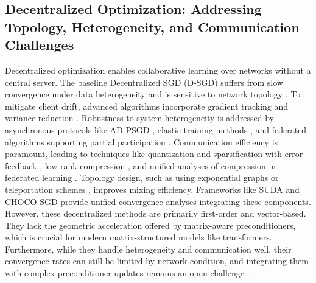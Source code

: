 \documentclass[11pt]{article}
\begin{document}
\subsection{Decentralized Optimization: Addressing Topology, Heterogeneity, and Communication Challenges}
Decentralized optimization enables collaborative learning over networks without a central server. The baseline Decentralized SGD (D-SGD) suffers from slow convergence under data heterogeneity and is sensitive to network topology \citep{alghunaim2022unified}. To mitigate client drift, advanced algorithms incorporate gradient tracking \citep{Tang2018D2DT, Liu2023DecentralizedGT, xin2021improved} and variance reduction \citep{Condat2024LoCoDLCD}. Robustness to system heterogeneity is addressed by asynchronous protocols like AD-PSGD \citep{Lian2017AsynchronousDP}, elastic training methods \citep{lin2019dynamic}, and federated algorithms supporting partial participation \citep{Wang2022FedADMMAF}. Communication efficiency is paramount, leading to techniques like quantization and sparsification with error feedback \citep{basu2019qsparse, Richtárik2021EF21AN, stich2018sparsified, Qian2020ErrorCD, Fatkhullin2023MomentumPI}, low-rank compression \citep{chen2025greedy}, and unified analyses of compression in federated learning \citep{Haddadpour2020FederatedLW}. Topology design, such as using exponential graphs \citep{Ying2021ExponentialGI} or teleportation schemes \citep{Takezawa2025ScalableDL}, improves mixing efficiency. Frameworks like SUDA \citep{alghunaim2022unified} and CHOCO-SGD \citep{Koloskova2019DecentralizedSO} provide unified convergence analyses integrating these components. However, these decentralized methods are primarily first-order and vector-based. They lack the geometric acceleration offered by matrix-aware preconditioners, which is crucial for modern matrix-structured models like transformers. Furthermore, while they handle heterogeneity and communication well, their convergence rates can still be limited by network condition, and integrating them with complex preconditioner updates remains an open challenge \citep{He2023UnbiasedCS, Huang2023StochasticCA, He2023LowerBA, Sato2020NetworkDensityControlledDP, He2024AdjacentLD, Carnevale2020GTAdamGT, Song2021OptimalGT}.
\end{document}
